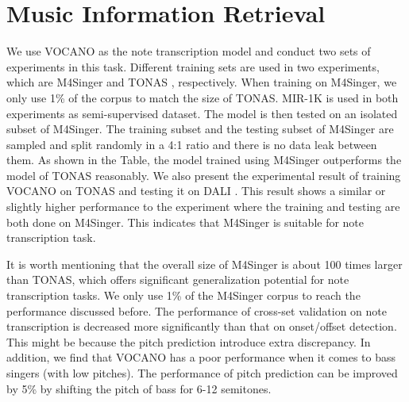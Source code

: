 \section{Music Information Retrieval}

We use VOCANO \citep{vocano} as the note transcription model and conduct two sets of experiments in this task. Different training sets are used in two experiments, which are M4Singer and TONAS \citep{Mora2010} \citep{Bonada2013}, respectively. When training on M4Singer, we only use 1\% of the corpus to match the size of TONAS. MIR-1K \citep{mir1k} is used in both experiments as semi-supervised dataset. The model is then tested on an isolated subset of M4Singer. The training subset and the testing subset of M4Singer are sampled and split randomly in a 4:1 ratio and there is no data leak between them. As shown in the Table, the model trained using M4Singer outperforms the model of TONAS reasonably. We also present the experimental result of training VOCANO on TONAS and testing it on DALI \citep{meseguer2019dali}. This result shows a similar or slightly higher performance to the experiment where the training and testing are both done on M4Singer. This indicates that M4Singer is suitable for note transcription task. 

It is worth mentioning that the overall size of M4Singer is about 100 times larger than TONAS, which offers significant generalization potential for note transcription tasks. We only use 1\% of the M4Singer corpus to reach the performance discussed before. The performance of cross-set validation on note transcription is decreased more significantly than that on onset/offset detection. This might be because the pitch prediction introduce extra discrepancy. In addition, we find that VOCANO has a poor performance when it comes to bass singers (with low pitches). The performance of pitch prediction can be improved by 5\% by shifting the pitch of bass for 6-12 semitones.